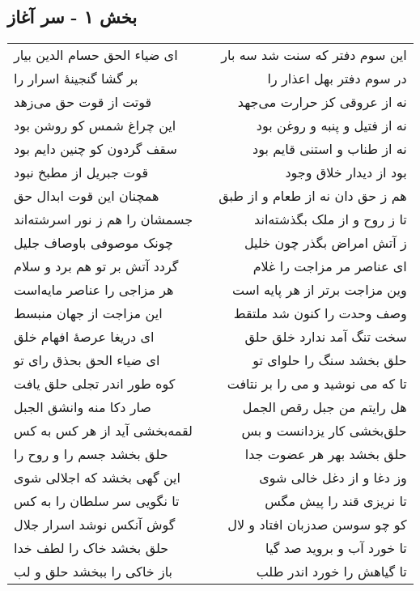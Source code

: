 \begin{center}
\section*{بخش ۱ - سر آغاز}
\label{sec:sh001}
\begin{longtable}{l p{0.5cm} r}
ای ضیاء الحق حسام الدین بیار
&&
این سوم دفتر که سنت شد سه بار
\\
بر گشا گنجینهٔ اسرار را
&&
در سوم دفتر بهل اعذار را
\\
قوتت از قوت حق می‌زهد
&&
نه از عروقی کز حرارت می‌جهد
\\
این چراغ شمس کو روشن بود
&&
نه از فتیل و پنبه و روغن بود
\\
سقف گردون کو چنین دایم بود
&&
نه از طناب و استنی قایم بود
\\
قوت جبریل از مطبخ نبود
&&
بود از دیدار خلاق وجود
\\
همچنان این قوت ابدال حق
&&
هم ز حق دان نه از طعام و از طبق
\\
جسمشان را هم ز نور اسرشته‌اند
&&
تا ز روح و از ملک بگذشته‌اند
\\
چونک موصوفی باوصاف جلیل
&&
ز آتش امراض بگذر چون خلیل
\\
گردد آتش بر تو هم برد و سلام
&&
ای عناصر مر مزاجت را غلام
\\
هر مزاجی را عناصر مایه‌است
&&
وین مزاجت برتر از هر پایه است
\\
این مزاجت از جهان منبسط
&&
وصف وحدت را کنون شد ملتقط
\\
ای دریغا عرصهٔ افهام خلق
&&
سخت تنگ آمد ندارد خلق حلق
\\
ای ضیاء الحق بحذق رای تو
&&
حلق بخشد سنگ را حلوای تو
\\
کوه طور اندر تجلی حلق یافت
&&
تا که می نوشید و می را بر نتافت
\\
صار دکا منه وانشق الجبل
&&
هل رایتم من جبل رقص الجمل
\\
لقمه‌بخشی آید از هر کس به کس
&&
حلق‌بخشی کار یزدانست و بس
\\
حلق بخشد جسم را و روح را
&&
حلق بخشد بهر هر عضوت جدا
\\
این گهی بخشد که اجلالی شوی
&&
وز دغا و از دغل خالی شوی
\\
تا نگویی سر سلطان را به کس
&&
تا نریزی قند را پیش مگس
\\
گوش آنکس نوشد اسرار جلال
&&
کو چو سوسن صدزبان افتاد و لال
\\
حلق بخشد خاک را لطف خدا
&&
تا خورد آب و بروید صد گیا
\\
باز خاکی را ببخشد حلق و لب
&&
تا گیاهش را خورد اندر طلب

\end{longtable}
\end{center}
